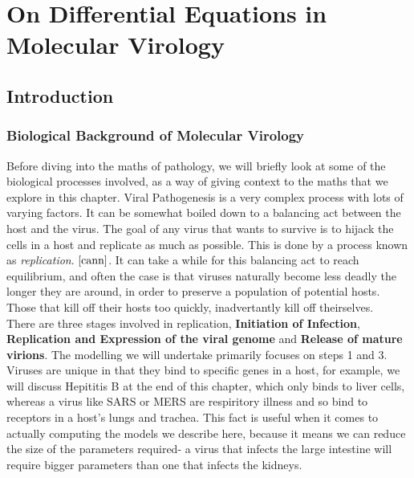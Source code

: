 \chapter{On Differential Equations in Molecular Virology}

\section{Introduction}

\subsection{Biological Background of Molecular Virology}

Before diving into the maths of pathology, we will briefly look at some of the biological processes involved, as a way of giving context to the maths that we explore in this chapter. Viral Pathogenesis is a very complex process with lots of varying factors. It can be somewhat boiled down to a balancing act between the host and the virus. The goal of any virus that wants to survive is to hijack the cells in a host and replicate as much as possible. This is done by a process known as \textit{replication}. $\cite{cann}$. It can take a while for this balancing act to reach equilibrium, and often the case is that viruses naturally become less deadly the longer they are around, in order to preserve a population of potential hosts. Those that kill off their hosts too quickly, inadvertantly kill off theirselves.\\

There are three stages involved in replication, \textbf{Initiation of Infection}, \textbf{Replication and Expression of the viral genome} and  \textbf{Release of mature virions}. The modelling we will undertake primarily focuses on steps 1 and 3. \\

Viruses are unique in that they bind to specific genes in a host, for example, we will discuss Hepititis B at the end of this chapter, which only binds to liver cells, whereas a virus like SARS or MERS are respiritory illness and so bind to receptors in a host's lungs and trachea. This fact is useful when it comes to actually computing the models we describe here, because it means we can reduce the size of the parameters required- a virus that infects the large intestine will require bigger parameters than one that infects the kidneys. \\

